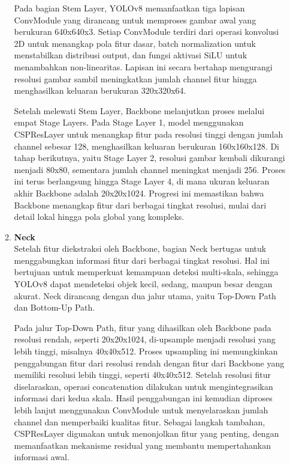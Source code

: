 \documentclass[journal,article,submit,pdftex,moreauthors]{Definitions/mdpi}
\begin{document}
\begin{itemize}
\begin{enumerate}
    \hspace*{2em}Pada bagian Stem Layer, YOLOv8 memanfaatkan tiga lapisan ConvModule yang dirancang untuk memproses gambar awal yang berukuran 640x640x3. Setiap ConvModule terdiri dari operasi konvolusi 2D untuk menangkap pola fitur dasar, batch normalization untuk menstabilkan distribusi output, dan fungsi aktivasi SiLU untuk menambahkan non-linearitas. Lapisan ini secara bertahap mengurangi resolusi gambar sambil meningkatkan jumlah channel fitur hingga menghasilkan keluaran berukuran 320x320x64.
    
    \hspace*{2em}Setelah melewati Stem Layer, Backbone melanjutkan proses melalui empat Stage Layers. Pada Stage Layer 1, model menggunakan CSPResLayer untuk menangkap fitur pada resolusi tinggi dengan jumlah channel sebesar 128, menghasilkan keluaran berukuran 160x160x128. Di tahap berikutnya, yaitu Stage Layer 2, resolusi gambar kembali dikurangi menjadi 80x80, sementara jumlah channel meningkat menjadi 256. Proses ini terus berlangsung hingga Stage Layer 4, di mana ukuran keluaran akhir Backbone adalah 20x20x1024. Progresi ini memastikan bahwa Backbone menangkap fitur dari berbagai tingkat resolusi, mulai dari detail lokal hingga pola global yang kompleks.

    \item \textbf{Neck} \\
    \hspace*{2em}Setelah fitur diekstraksi oleh Backbone, bagian Neck bertugas untuk menggabungkan informasi fitur dari berbagai tingkat resolusi. Hal ini bertujuan untuk memperkuat kemampuan deteksi multi-skala, sehingga YOLOv8 dapat mendeteksi objek kecil, sedang, maupun besar dengan akurat. Neck dirancang dengan dua jalur utama, yaitu Top-Down Path dan Bottom-Up Path.
    
    \hspace*{2em}Pada jalur Top-Down Path, fitur yang dihasilkan oleh Backbone pada resolusi rendah, seperti 20x20x1024, di-upsample menjadi resolusi yang lebih tinggi, misalnya 40x40x512. Proses upsampling ini memungkinkan penggabungan fitur dari resolusi rendah dengan fitur dari Backbone yang memiliki resolusi lebih tinggi, seperti 40x40x512. Setelah resolusi fitur diselaraskan, operasi concatenation dilakukan untuk mengintegrasikan informasi dari kedua skala. Hasil penggabungan ini kemudian diproses lebih lanjut menggunakan ConvModule untuk menyelaraskan jumlah channel dan memperbaiki kualitas fitur. Sebagai langkah tambahan, CSPResLayer digunakan untuk menonjolkan fitur yang penting, dengan memanfaatkan mekanisme residual yang membantu mempertahankan informasi awal.
    

\end{enumerate}
\end{itemize}
\end{document}
